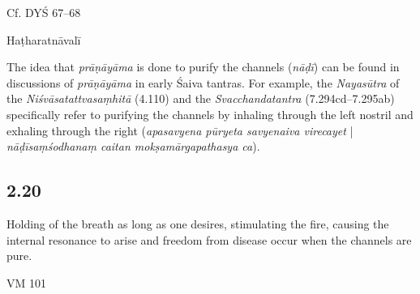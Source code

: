 \begin{ekdosis}
\begin{sources}[hp02_019]
Cf.  DYŚ 67--68

\begin{versinnote}
\end{versinnote}
\end{sources}

\begin{testimonia}[hp02_019]
Haṭharatnāvalī

\begin{versinnote}
\end{versinnote}
\end{testimonia}

\begin{philcomm}[hp02_019]
The idea that \emph{prāṇāyāma} is done to purify the channels (\emph{nāḍī}) can be found in discussions of \emph{prāṇāyāma} in early Śaiva tantras. For example, the \emph{Nayasūtra} of the \emph{Niśvāsatattvasaṃhitā} (4.110) and the \emph{Svacchandatantra} (7.294cd–7.295ab) specifically refer to purifying the channels by inhaling through the left nostril and exhaling through the right (\emph{apasavyena pūryeta savyenaiva virecayet} | \emph{nāḍīsaṃśodhanaṃ caitan mokṣamārgapathasya ca}).
\end{philcomm}

\subsection*{2.20}
\begin{translation}[hp02_020]
Holding of the breath as long as one desires, stimulating the fire, causing the internal resonance to arise and freedom from disease occur when the channels are pure.
\end{translation}

\begin{sources}[hp02_020]
VM 101

\begin{versinnote}
\end{versinnote}
\end{sources}


\end{ekdosis}
